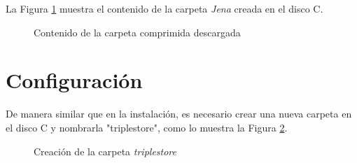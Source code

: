 La Figura \ref{contenido-instalacion-apache-jena-fiseki} muestra el contenido de la carpeta \textit{Jena} creada en el disco C.

\begin{figure}[!ht]
	\centering
    \caption{Contenido de la carpeta comprimida descargada}
    \label{contenido-instalacion-apache-jena-fiseki}
\end{figure}

\section{Configuración}

De manera similar que en la instalación, es necesario crear una nueva carpeta en el disco C y nombrarla "triplestore", como lo muestra la Figura \ref{carpeta-triplestore-apache-jena-fiseki}.\newline

\begin{figure}[!ht]
	\centering
    \caption{Creación de la carpeta \textit{triplestore}}
    \label{carpeta-triplestore-apache-jena-fiseki}
\end{figure}

